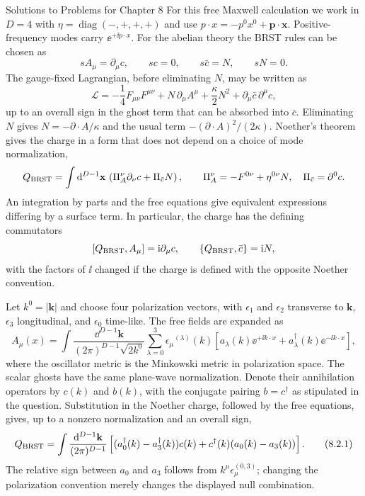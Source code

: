 \begin{bankssolutions}{Solutions to Problems for Chapter 8}
For this free Maxwell calculation we work in $D=4$ with
$\eta=\operatorname{diag}(-,+,+,+)$ and use
$p\cdot x=-p^0x^0+\mathbf p\cdot\mathbf x$. Positive-frequency modes carry
$\ee^{+\ii p\cdot x}$.
For the abelian theory the BRST rules can be chosen as
\[
  sA_\mu=\partial_\mu c,\qquad sc=0,\qquad s\bar c=N,
  \qquad sN=0.
\]
The gauge-fixed Lagrangian, before eliminating $N$, may be written as
\[
  \mathcal L=-\frac14F_{\mu\nu}F^{\mu\nu}
  +N\,\partial_\mu A^\mu+\frac\kappa2N^2
  +\partial_\mu\bar c\,\partial^\mu c,
\]
up to an overall sign in the ghost term that can be absorbed into $\bar c$.
Eliminating $N$ gives $N=-\partial\cdot A/\kappa$ and the usual term
$-(\partial\cdot A)^2/(2\kappa)$.  Noether's theorem gives the charge in a
form that does not depend on a choice of mode normalization,
\[
  Q_{\rm BRST}=\int\mathop{}\!\mathrm{d}^{D-1}\mathbf x\,
  \left(\Pi_A^{\nu}\partial_\nu c+\Pi_{\bar c}N\right),
  \qquad
  \Pi_A^{\nu}=-F^{0\nu}+\eta^{0\nu}N,
  \quad \Pi_{\bar c}=\partial^0c .
\]
An integration by parts and the free equations give equivalent expressions
differing by a surface term.  In particular, the charge has the defining
commutators
\[
  [Q_{\rm BRST},A_\mu]=\mathrm{i}\partial_\mu c,
  \qquad \{Q_{\rm BRST},\bar c\}=\mathrm{i} N,
\]
with the factors of $\ii$ changed if the charge is defined with the opposite
Noether convention.

Let $k^0=|\mathbf k|$ and choose four polarization vectors, with $\epsilon_1$
and $\epsilon_2$ transverse to $\mathbf k$, $\epsilon_3$ longitudinal, and
$\epsilon_0$ time-like.  The free fields are expanded as
\[
  A_\mu(x)=\int\frac{\dd^{D-1}\mathbf k}{(2\pi)^{D-1}\sqrt{2k^0}}
  \sum_{\lambda=0}^3\epsilon_\mu{}^{(\lambda)}(k)
  \left[a_\lambda(k)\ee^{+\ii k\cdot x}
       +a_\lambda^\dagger(k)\ee^{-\ii k\cdot x}\right],
\]
where the oscillator metric is the Minkowski metric in polarization space.
The scalar ghosts have the same plane-wave normalization.  Denote their
annihilation operators by $c(k)$ and $b(k)$, with the conjugate pairing
$b=c^\dagger$ as stipulated in the question.  Substitution in the Noether
charge, followed by the free equations, gives, up to a nonzero normalization
and an overall sign,
\[
  Q_{\rm BRST}=\int\frac{\mathop{}\!\mathrm{d}^{D-1}\mathbf k}{(2\pi)^{D-1}}
  \left[(a_0^\dagger(k)-a_3^\dagger(k))c(k)
       +c^\dagger(k)(a_0(k)-a_3(k))\right].
  \tag{8.2.1}
\]
The relative sign between $a_0$ and $a_3$ follows from
$k^\mu\epsilon_\mu^{(0,3)}$; changing the polarization convention merely
changes the displayed null combination.


\end{bankssolutions}
